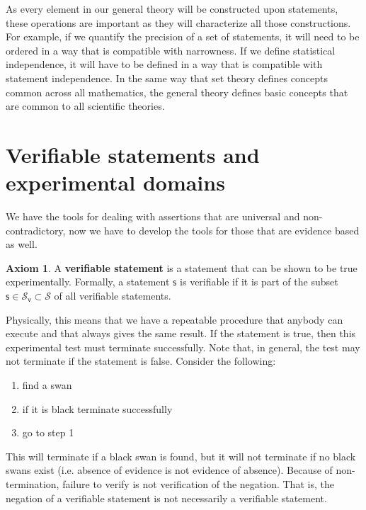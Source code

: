 \documentclass[%
reprint,
amsmath,amssymb,
aps,
prx,
]{revtex4-1}
\theoremstyle{plain}%
\theoremstyle{definition}
\newtheorem{axiom}[thrm]{Axiom}
\theoremstyle{remark}
\def\stmtSet{\mathcal{S}}
\def\vstmtSet{\mathcal{S}_\textsf{v}}
\newcommand{\stmt}[1][s] {\mathsf{#1}}
\begin{document}
As every element in our general theory will be constructed upon statements, these operations are important as they will characterize all those constructions. For example, if we quantify the precision of a set of statements, it will need to be ordered in a way that is compatible with narrowness. If we define statistical independence, it will have to be defined in a way that is compatible with statement independence. In the same way that set theory defines concepts common across all mathematics, the general theory defines basic concepts that are common to all scientific theories.

\section{Verifiable statements and experimental domains}

We have the tools for dealing with assertions that are universal and non-contradictory, now we have to develop the tools for those that are evidence based as well.

\begin{axiom}\label{ax_verifiable_statements}
	A \textbf{verifiable statement} is a statement that can be shown to be true experimentally. Formally, a statement $\stmt$ is verifiable if it is part of the subset $\stmt \in \vstmtSet \subset \stmtSet$ of all verifiable statements.
\end{axiom}

Physically, this means that we have a repeatable procedure that anybody can execute and that always gives the same result. If the statement is true, then this experimental test must terminate successfully. Note that, in general, the test may not terminate if the statement is false. Consider the following:
\begin{enumerate}
	\item find a swan
	\item if it is black terminate successfully
	\item go to step 1
\end{enumerate}
This will terminate if a black swan is found, but it will not terminate if no black swans exist (i.e. absence of evidence is not evidence of absence). Because of non-termination, failure to verify is not verification of the negation. That is, the negation of a verifiable statement is not necessarily a verifiable statement.
\end{document}

